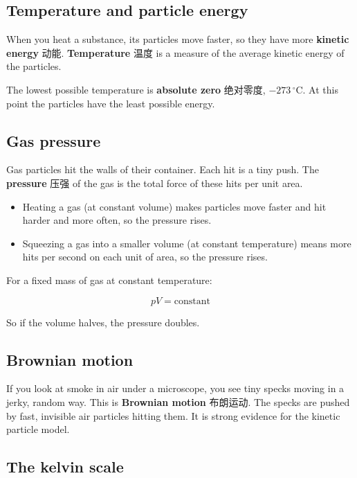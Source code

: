 \documentclass[11pt]{article}
\begin{document}
\subsection*{Temperature and particle energy}

When you heat a substance, its particles move faster, so they have more \textbf{kinetic energy} 动能. \textbf{Temperature} 温度 is a measure of the average kinetic energy of the particles.

The lowest possible temperature is \textbf{absolute zero} 绝对零度, $-273\,^{\circ}\text{C}$. At this point the particles have the least possible energy.

\subsection*{Gas pressure}

Gas particles hit the walls of their container. Each hit is a tiny push. The \textbf{pressure} 压强 of the gas is the total force of these hits per unit area.

\begin{itemize}
\item Heating a gas (at constant volume) makes particles move faster and hit harder and more often, so the pressure rises.

\item Squeezing a gas into a smaller volume (at constant temperature) means more hits per second on each unit of area, so the pressure rises.

\end{itemize}

For a fixed mass of gas at constant temperature:

\[
pV = \text{constant}
\]

So if the volume halves, the pressure doubles.

\subsection*{Brownian motion}

If you look at smoke in air under a microscope, you see tiny specks moving in a jerky, random way. This is \textbf{Brownian motion} 布朗运动. The specks are pushed by fast, invisible air particles hitting them. It is strong evidence for the kinetic particle model.

\subsection*{The kelvin scale}
\end{document}

